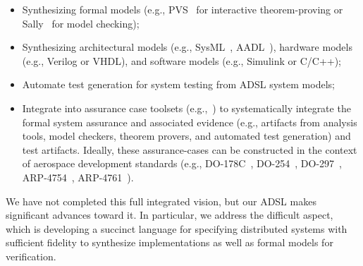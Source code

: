 \begin{itemize}
\item Synthesizing formal models (e.g., PVS~\cite{SRI:PVS} for interactive theorem-proving or Sally~\cite{sally} for model checking);
\item Synthesizing architectural models (e.g., SysML~\cite{SysML}, AADL~\cite{feiler06aadl-intro,as5506}), hardware models (e.g., Verilog or VHDL), and software models (e.g., Simulink or C/C++);
\item Automate test generation for system testing from ADSL system models;

\item Integrate into assurance case toolsets (e.g.,~\cite{Rushby05anevidential,CruanesHOS13}) to systematically integrate the
  formal system assurance and associated evidence (e.g., artifacts from analysis
  tools, model checkers, theorem provers, and automated test generation) and
  test artifacts. Ideally, these assurance-cases can be constructed in the context of aerospace development
  standards (e.g., DO-178C~\cite{do178c}, DO-254~\cite{do254}, DO-297~\cite{do297}, ARP-4754~\cite{arp4754}, ARP-4761~\cite{arp4761}).

\end{itemize}

\noindent
We have not completed this full integrated vision, but our ADSL makes significant advances toward it. In particular, we address the difficult aspect, which is developing a succinct language for specifying distributed systems with sufficient fidelity to synthesize implementations as well as formal models for verification.

